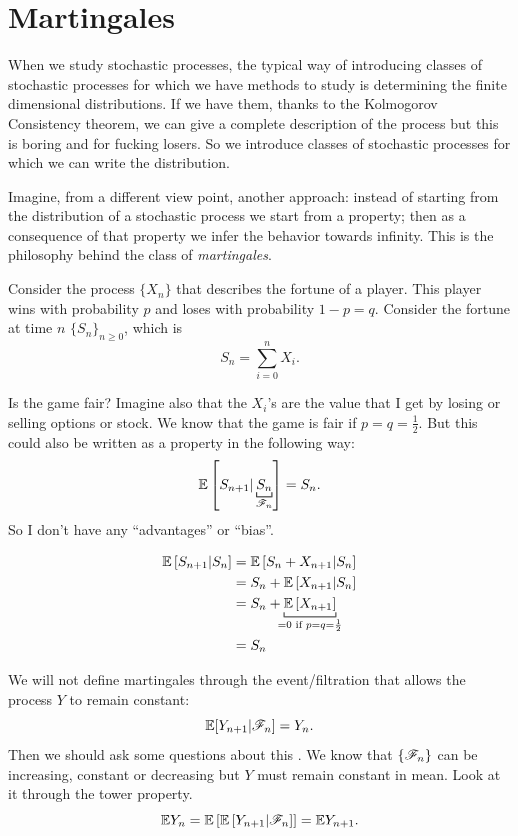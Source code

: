 \documentclass{report}
\begin{document}
\section{Martingales}
When we study stochastic processes, the typical way of introducing classes of stochastic processes for which we have methods to study is determining the finite dimensional distributions. If we have them, thanks to the Kolmogorov Consistency theorem, we can give a complete description of the process but this is boring and for fucking losers. So we introduce classes of stochastic processes for which we can write the distribution.\par
Imagine, from a different view point, another approach: instead of starting from the distribution of a stochastic process we start from a property; then as a consequence of that property we infer the behavior towards infinity. This is the philosophy behind the class of \emph{martingales}.
\begin{example}
	Consider the process $\{X_{n}\}$ that describes the fortune of a player. This player wins with probability $p$ and loses with probability $1-p=q$. Consider the fortune at time $n$ ${\{S_n\}}_{n\geq 0}$, which is 
	\[S_n=\sum_{i=0}^{n}X_i.\]
\end{example}
	Is the game fair? Imagine also that the $X_i$'s are the value that I get by losing or selling options or stock. We know that the game is fair if $p=q=\frac{1}{2}$. But this could also be written as a property in the following way:
	\[\ev\left[S_{n+1}|\underbracket[0.64pt]{S_n}_{\F_n}\right]=S_n.\]
	So I don't have any ``advantages'' or ``bias''.
	\begin{fancyproof}
		\begin{align*}
			\ev\left[S_{n+1}|S_n\right]&=\ev\left[S_n+X_{n+1}|S_n\right]\\
			&=S_n+\ev\left[X_{n+1}|S_n\right]\\
			&=S_n+\underbracket[0,6pt]{\ev\left[X_{n+1}\right]}_{\mathclap{=0\text{ if }p=q=\frac{1}{2}}}\\
			&=S_n
		\end{align*}
	\end{fancyproof}
We will not define martingales through the event/filtration that allows the process $Y$ to remain constant:
\[\mathbb{E}[Y_{n+1}|\mathscr{F}_n]=Y_n.\]
Then we should ask some questions about this \sa. We know that $\{\mathscr{F}_n\}$ can be increasing, constant or decreasing but $Y$ must remain constant in mean. Look at it through the tower property.
\[\mathbb{E} Y_n=\mathbb{E}\left[\mathbb{E}\left[Y_{n+1}|\mathscr{F}_n\right]\right]=\mathbb{E} Y_{n+1}.\]
\end{document}
